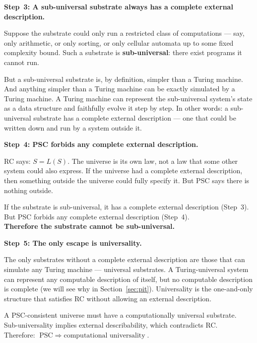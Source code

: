 \documentclass[11pt,a4paper]{article}
\newcommand{\term}[1]{\textbf{#1}}
\begin{document}
\medskip
\textbf{Step~3: A sub-universal substrate always has a complete external description.}

Suppose the substrate could only run a restricted class of computations — say, only
arithmetic, or only sorting, or only cellular automata up to some fixed complexity bound.
Such a substrate is \term{sub-universal}: there exist programs it cannot run.

But a sub-universal substrate is, by definition, simpler than a Turing machine.
And anything simpler than a Turing machine can be exactly simulated by a Turing machine.
A Turing machine can represent the sub-universal system's state as a data structure and
faithfully evolve it step by step.  In other words: a sub-universal substrate has a
complete external description — one that could be written down and run by a system
outside it.

\medskip
\textbf{Step~4: PSC forbids any complete external description.}

RC says: $S = L(S)$.  The universe is its own law, not a law that some other system
could also express.  If the universe had a complete external description, then something
outside the universe could fully specify it.  But PSC says there is nothing outside.

\begin{tcolorbox}[colback=boxred,colframe=red!50!black,title=The contradiction]
If the substrate is sub-universal, it has a complete external description (Step~3).\\
But PSC forbids any complete external description (Step~4).\\
\textbf{Therefore the substrate cannot be sub-universal.}
\end{tcolorbox}

\textbf{Step~5: The only escape is universality.}

The only substrates without a complete external description are those that can simulate
any Turing machine — universal substrates.  A Turing-universal system can represent
any computable description of itself, but no computable description is complete (we will
see why in Section~\ref{sec:pit}).  Universality is the one-and-only structure that
satisfies RC without allowing an external description.

\begin{tcolorbox}[colback=boxgreen,colframe=green!50!black,
  title=The PSC-Universality Theorem]
A PSC-consistent universe must have a computationally universal substrate.\\
Sub-universality implies external describability, which contradicts RC.\\
Therefore: $\text{PSC} \;\Rightarrow\; \text{computational universality}$.
\end{tcolorbox}
\end{document}
